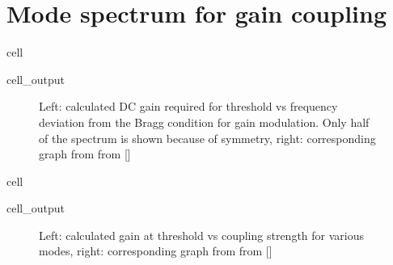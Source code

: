 \documentclass[a4paper,10pt,english,openany,oneside]{jupyterBook}
\begin{document}
\section{Mode spectrum for gain coupling}
\label{\detokenize{Kogelnik-Shank_Coupled-Wave-Theory_DFB-Lasers:mode-spectrum-for-gain-coupling}}
\begin{sphinxuseclass}{cell}\begin{sphinxVerbatimOutput}

\begin{sphinxuseclass}{cell_output}
\begin{figure}[htbp]
\centering
\capstart

\noindent{}
\caption{Left: calculated DC gain required for threshold vs frequency deviation from the Bragg condition for gain modulation. Only half of the spectrum is shown because of symmetry, right: corresponding graph from from {[}{]}}\label{\detokenize{Kogelnik-Shank_Coupled-Wave-Theory_DFB-Lasers:kogelnik7c}}\end{figure}

\end{sphinxuseclass}\end{sphinxVerbatimOutput}

\end{sphinxuseclass}
\begin{sphinxuseclass}{cell}\begin{sphinxVerbatimOutput}

\begin{sphinxuseclass}{cell_output}
\begin{figure}[htbp]
\centering
\capstart

\noindent{}
\caption{Left: calculated gain at threshold vs coupling strength for various modes, right: corresponding graph from from {[}{]}}\label{\detokenize{Kogelnik-Shank_Coupled-Wave-Theory_DFB-Lasers:kogelnik8c}}\end{figure}

\end{sphinxuseclass}\end{sphinxVerbatimOutput}

\end{sphinxuseclass}
\end{document}
